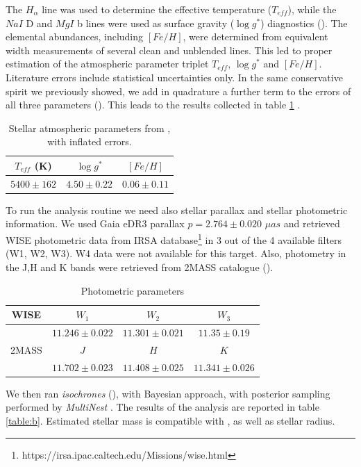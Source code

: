 \documentclass{aa}
\begin{document}
The $H_{\alpha}$ line was used to determine the effective temperature ($T_{eff}$),
while the $NaI$ D and $MgI$ b lines were used as surface gravity
($\log{g^*}$) diagnostics (\cite{Anderson}). The elemental abundances, including $[Fe/H]$, 
were determined from equivalent width measurements of several clean and 
unblended lines. This led to proper estimation of the atmospheric parameter 
triplet $T_{eff}$, $\log{g^*}$ and $[Fe/H]$. Literature errors include statistical 
uncertainties only. In the same conservative spirit we 
previously showed, we add in quadrature a further term to the errors of 
all three parameters (\cite{Sousa}). 
This leads to the results collected in table \ref{table:a} .
\begin{table}[h]
\centering
    \begin{tabular}{ccc}
    \hline
    $T_{eff}$ (K) & $\log{g^*}$ & $[Fe/H]$ \\
    \hline
    $5400 \pm 162$ & $4.50 \pm 0.22$ & $0.06 \pm 0.11$ \\
    \hline
    \end{tabular}
     \caption{Stellar atmospheric parameters from \cite{Anderson}, with inflated errors.}
\label{table:a}
\end{table}
To run the analysis routine we need also stellar parallax and stellar photometric information. We used Gaia eDR3 parallax $p=2.764 \pm 0.020$ $\mu as$ and retrieved WISE photometric data from IRSA database\footnote{https://irsa.ipac.caltech.edu/Missions/wise.html} in 3 out of the 4 available filters (W1, W2, W3). W4 data were not available for this target. Also, photometry in the J,H and K bands were retrieved from 2MASS catalogue (\cite{2MASS}).
\begin{table}[h]
\centering
    \begin{tabular}{cccc}
    \hline
    WISE & $W_1$ & $W_2$ & $W_3$ \\
    \hline
    & $11.246 \pm 0.022$ & $11.301 \pm 0.021$ & $11.35 \pm 0.19$ \\
    \hline
    \hline
    2MASS & $J$ & $H$ & $K$ \\
    \hline
    & $11.702 \pm 0.023$ & $11.408 \pm 0.025$ & $11.341 \pm 0.026$ \\
    \hline
    \end{tabular}
     \caption{Photometric parameters}
\label{table:star_phot}
\end{table}
We then ran \textit{isochrones} (\cite{Morton}), with Bayesian approach,
with posterior sampling performed by \textit{MultiNest} . The results of the analysis are reported in table \ref{table:b}. Estimated stellar mass is compatible with \cite{Addison}, as well as stellar radius.
\end{document}
